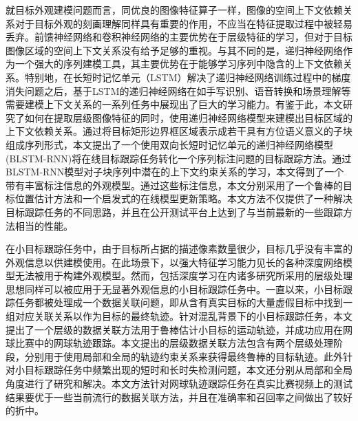 {%
就目标外观建模问题而言，同优良的图像特征算子一样，图像的空间上下文依赖关系对于目标外观的刻画理解同样具有重要的作用，不应当在特征提取过程中被轻易丢弃。前馈神经网络和卷积神经网络的主要优势在于层级特征的学习，但对于目标图像区域的空间上下文关系没有给予足够的重视。与其不同的是，递归神经网络作为一个强大的序列建模工具，其主要优势在于能够学习序列中隐含的上下文依赖关系。特别地，在长短时记忆单元（LSTM）解决了递归神经网络训练过程中的梯度消失问题之后，基于LSTM的递归神经网络在如手写识别、语音转换和场景理解等需要建模上下文关系的一系列任务中展现出了巨大的学习能力。有鉴于此，本文研究了如何在提取层级图像特征的同时，使用递归神经网络模型来建模出目标区域的上下文依赖关系。通过将目标矩形边界框区域表示成若干具有方位语义意义的子块组成序列形式，本文提出了一个使用双向长短时记忆单元的递归神经网络模型(BLSTM-RNN)将在线目标跟踪任务转化一个序列标注问题的目标跟踪方法。通过BLSTM-RNN模型对子块序列中潜在的上下文约束关系的学习，本文得到了一个带有丰富标注信息的外观模型。通过这些标注信息，本文分别采用了一个鲁棒的目标位置估计方法和一个启发式的在线模型更新策略。本文方法不仅提供了一种解决目标跟踪任务的不同思路，并且在公开测试平台上达到了与当前最新的一些跟踪方法相当的性能。

在小目标跟踪任务中，由于目标所占据的描述像素数量很少，目标几乎没有丰富的外观信息以供建模使用。在此场景下，以强大特征学习能力见长的各种深度网络模型无法被用于构建外观模型。然而，包括深度学习在内诸多研究所采用的层级处理思想同样可以被应用于无显著外观信息的小目标跟踪任务中。一直以来，小目标跟踪任务都被处理成一个数据关联问题，即从含有真实目标的大量虚假目标中找到一组对应关联关系以作为目标的最终轨迹。针对混乱背景下的小目标跟踪任务，本文提出了一个层级的数据关联方法用于鲁棒估计小目标的运动轨迹，并成功应用在网球比赛中的网球轨迹跟踪。本文提出的层级数据关联方法包含有两个层级处理阶段，分别用于使用局部和全局的轨迹约束关系来获得最终鲁棒的目标轨迹。此外针对小目标跟踪任务中频繁出现的短时和长时失检测问题，本文还分别从局部和全局角度进行了研究和解决。本文方法针对网球轨迹跟踪任务在真实比赛视频上的测试结果要优于一些当前流行的数据关联方法，并且在准确率和召回率之间做出了较好的折中。

}
